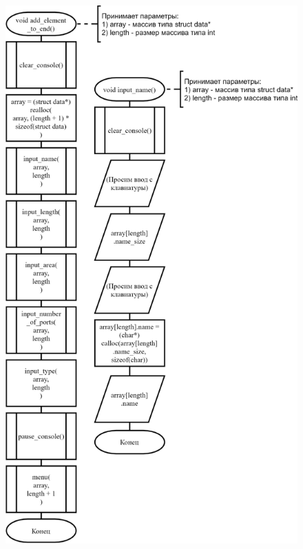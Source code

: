 \begin{figure}[!htp]
    \includegraphics{../src/menu/add_element_end/add_element_end-1.png}
\end{figure}

